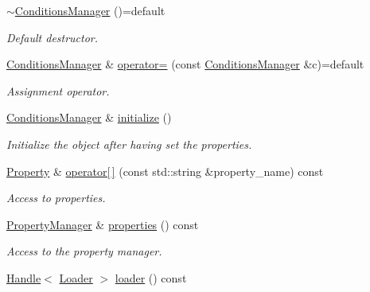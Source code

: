 \begin{DoxyCompactItemize}
\hyperlink{class_d_d4hep_1_1_conditions_1_1_conditions_manager_a165b25f83b4da883427e061966b5ee3d}{$\sim$\+Conditions\+Manager} ()=default
\begin{DoxyCompactList}\small\item\em Default destructor. \end{DoxyCompactList}\item 
\hyperlink{class_d_d4hep_1_1_conditions_1_1_conditions_manager}{Conditions\+Manager} \& \hyperlink{class_d_d4hep_1_1_conditions_1_1_conditions_manager_a4fdcb873c3b655468e0ab78da143abe5}{operator=} (const \hyperlink{class_d_d4hep_1_1_conditions_1_1_conditions_manager}{Conditions\+Manager} \&c)=default
\begin{DoxyCompactList}\small\item\em Assignment operator. \end{DoxyCompactList}\item 
\hyperlink{class_d_d4hep_1_1_conditions_1_1_conditions_manager}{Conditions\+Manager} \& \hyperlink{class_d_d4hep_1_1_conditions_1_1_conditions_manager_a5908a4b7d16963e26e7bc453eae9bd40}{initialize} ()
\begin{DoxyCompactList}\small\item\em Initialize the object after having set the properties. \end{DoxyCompactList}\item 
\hyperlink{class_d_d4hep_1_1_property}{Property} \& \hyperlink{class_d_d4hep_1_1_conditions_1_1_conditions_manager_aa6e2d1662cc895c713016e873ea7fea5}{operator\mbox{[}$\,$\mbox{]}} (const std\+::string \&property\+\_\+name) const
\begin{DoxyCompactList}\small\item\em Access to properties. \end{DoxyCompactList}\item 
\hyperlink{class_d_d4hep_1_1_property_manager}{Property\+Manager} \& \hyperlink{class_d_d4hep_1_1_conditions_1_1_conditions_manager_abc62c92ba92ab44843072adf85e1dde3}{properties} () const
\begin{DoxyCompactList}\small\item\em Access to the property manager. \end{DoxyCompactList}\item 
\hyperlink{class_d_d4hep_1_1_handle}{Handle}$<$ \hyperlink{class_d_d4hep_1_1_conditions_1_1_conditions_manager_acd0f1e242240cc1c07a0d029a716a718}{Loader} $>$ \hyperlink{class_d_d4hep_1_1_conditions_1_1_conditions_manager_a3325caecfb6a97977a6f5338d30f38bb}{loader} () const

\end{DoxyCompactItemize}
